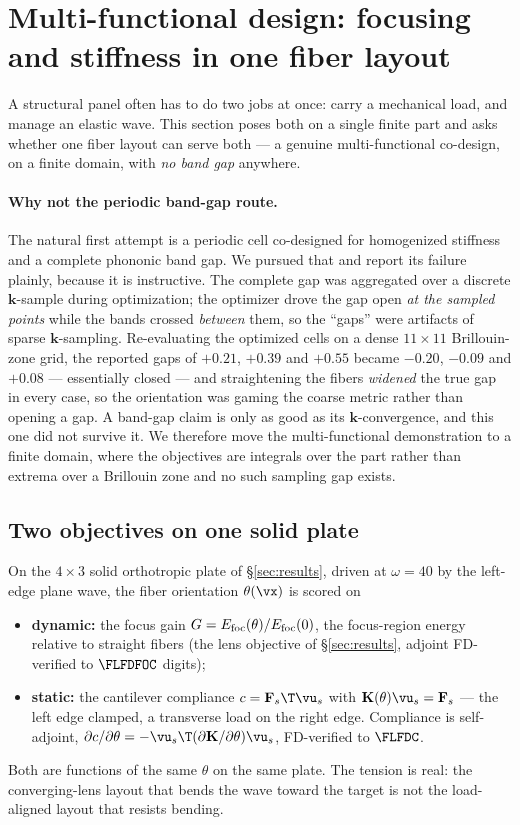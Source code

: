 \documentclass[11pt]{article}
\begin{document}
\section{Multi-functional design: focusing and stiffness in one fiber layout}
\label{sec:multifunc}
A structural panel often has to do two jobs at once: carry a mechanical load, and
manage an elastic wave. This section poses both on a single finite part and asks
whether one fiber layout can serve both --- a genuine multi-functional co-design,
on a finite domain, with \emph{no band gap} anywhere.

\paragraph{Why not the periodic band-gap route.}
The natural first attempt is a periodic cell co-designed for homogenized
stiffness and a complete phononic band gap. We pursued that and report its
failure plainly, because it is instructive. The complete gap was aggregated over
a discrete $\mathbf k$-sample during optimization; the optimizer drove the gap
open \emph{at the sampled points} while the bands crossed \emph{between} them, so
the ``gaps'' were artifacts of sparse $\mathbf k$-sampling. Re-evaluating the
optimized cells on a dense $11\times11$ Brillouin-zone grid, the reported gaps of
$+0.21$, $+0.39$ and $+0.55$ became $-0.20$, $-0.09$ and $+0.08$ --- essentially
closed --- and straightening the fibers \emph{widened} the true gap in every
case, so the orientation was gaming the coarse metric rather than opening a gap.
A band-gap claim is only as good as its $\mathbf k$-convergence, and this one did
not survive it. We therefore move the multi-functional demonstration to a finite
domain, where the objectives are integrals over the part rather than extrema over
a Brillouin zone and no such sampling gap exists.

\subsection{Two objectives on one solid plate}
On the $4\times3$ solid orthotropic plate of \S\ref{sec:results}, driven at
$\omega=40$ by the left-edge plane wave, the fiber orientation $\theta(\vx)$ is
scored on
\begin{itemize}\itemsep0pt
  \item \textbf{dynamic:} the focus gain $G=E_{\rm foc}(\theta)/E_{\rm foc}(0)$,
        the focus-region energy relative to straight fibers (the lens objective
        of \S\ref{sec:results}, adjoint FD-verified to $\FLFDFOC$ digits);
  \item \textbf{static:} the cantilever compliance $c=\mathbf{F}_s\T\vu_s$ with
        $\mathbf{K}(\theta)\vu_s=\mathbf{F}_s$ --- the left edge clamped, a transverse load on
        the right edge. Compliance is self-adjoint, $\partial c/\partial\theta=
        -\vu_s\T(\partial\mathbf{K}/\partial\theta)\vu_s$, FD-verified to $\FLFDC$.
\end{itemize}
Both are functions of the same $\theta$ on the same plate. The tension is real:
the converging-lens layout that bends the wave toward the target is not the
load-aligned layout that resists bending.
\end{document}
